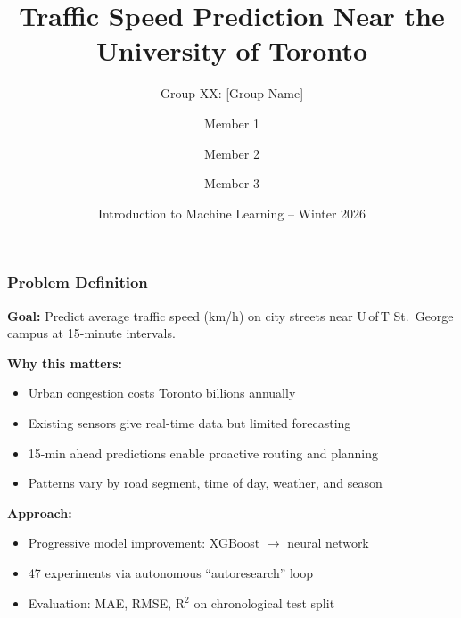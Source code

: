 \documentclass{beamer}
\title[Traffic Speed Prediction]
{Traffic Speed Prediction Near the\\University of Toronto}
\subtitle{Group XX: [Group Name]}
\author[Group XX: Group Name]
{Member 1\inst{1} \and Member 2\inst{1} \and Member 3\inst{1}}
\institute[ ]
{
  \inst{1}%
  Dept.\ of ECE, University of Toronto
}
\date[IntroML]
{Introduction to Machine Learning -- Winter 2026}
\begin{document}
\frame{\titlepage}


\begin{frame}
\frametitle{Problem Definition}

\textbf{Goal:} Predict average traffic speed (km/h) on city streets near U\,of\,T St.\ George campus at 15-minute intervals.

\bigskip
\textbf{Why this matters:}
\begin{itemize}\setlength\itemsep{4pt}
  \item Urban congestion costs Toronto billions annually
  \item Existing sensors give real-time data but limited forecasting
  \item 15-min ahead predictions enable proactive routing and planning
  \item Patterns vary by road segment, time of day, weather, and season
\end{itemize}

\bigskip
\textbf{Approach:}
\begin{itemize}\setlength\itemsep{4pt}
  \item Progressive model improvement: XGBoost $\rightarrow$ neural network
  \item 47 experiments via autonomous ``autoresearch'' loop
  \item Evaluation: MAE, RMSE, R$^2$ on chronological test split
\end{itemize}
\end{frame}
\end{document}
